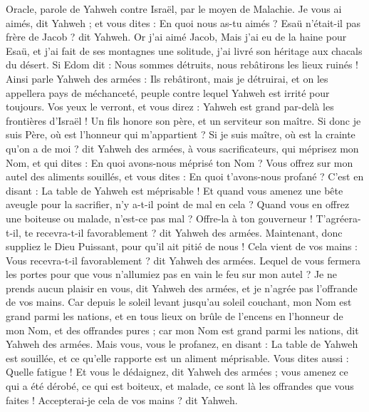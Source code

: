 \BFont
\begin{multicols}{2}
\VerseOne{}Oracle, parole de Yahweh contre Israël, par le moyen de Malachie.
Je vous ai aimés, dit Yahweh ; et vous dites : En quoi nous as-tu aimés ? Esaü n'était-il pas frère de Jacob ? dit Yahweh. Or j'ai aimé Jacob,
Mais j'ai eu de la haine pour Esaü, et j'ai fait de ses montagnes une solitude, j’ai livré son héritage aux chacals du désert.
Si Edom dit : Nous sommes détruits, nous rebâtirons les lieux ruinés ! Ainsi parle Yahweh des armées : Ils rebâtiront, mais je détruirai, et on les appellera pays de méchanceté, peuple contre lequel Yahweh est irrité pour toujours.
Vos yeux le verront, et vous direz : Yahweh est grand par-delà les frontières d'Israël !
Un fils honore son père, et un serviteur son maître. Si donc je suis Père, où est l'honneur qui m'appartient ? Si je suis maître, où est la crainte qu'on a de moi ? dit Yahweh des armées, à vous sacrificateurs, qui méprisez mon Nom, et qui dites : En quoi avons-nous méprisé ton Nom ?
Vous offrez sur mon autel des aliments souillés, et vous dites : En quoi t'avons-nous profané ? C'est en disant : La table de Yahweh est méprisable !
Et quand vous amenez une bête aveugle pour la sacrifier, n'y a-t-il point de mal en cela ? Quand vous en offrez une boiteuse ou malade, n’est-ce pas mal ? Offre-la à ton gouverneur ! T’agréera-t-il, te recevra-t-il favorablement ? dit Yahweh des armées.
Maintenant, donc suppliez le Dieu Puissant, pour qu'il ait pitié de nous ! Cela vient de vos mains : Vous recevra-t-il favorablement ? dit Yahweh des armées.
Lequel de vous fermera les portes pour que vous n’allumiez pas en vain le feu sur mon autel ? Je ne prends aucun plaisir en vous, dit Yahweh des armées, et je n’agrée pas l'offrande de vos mains.
Car depuis le soleil levant jusqu'au soleil couchant, mon Nom est grand parmi les nations, et en tous lieux on brûle de l’encens en l'honneur de mon Nom, et des offrandes pures ; car mon Nom est grand parmi les nations, dit Yahweh des armées.
Mais vous, vous le profanez, en disant : La table de Yahweh est souillée, et ce qu’elle rapporte est un aliment méprisable.
Vous dites aussi : Quelle fatigue ! Et vous le dédaignez, dit Yahweh des armées ; vous amenez ce qui a été dérobé, ce qui est boiteux, et malade, ce sont là les offrandes que vous faites ! Accepterai-je cela de vos mains ? dit Yahweh.

\end{multicols}
